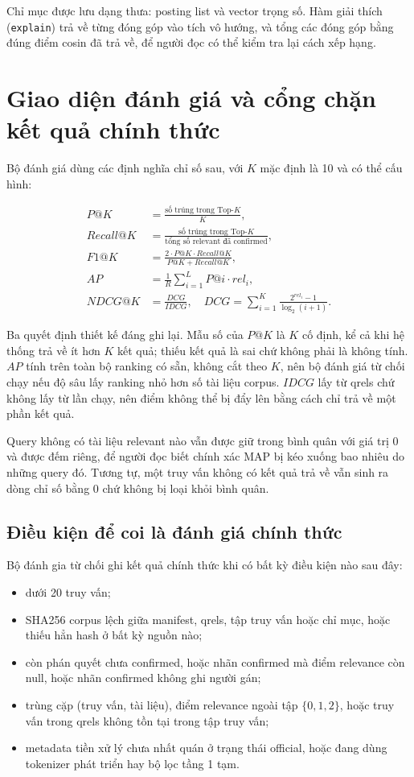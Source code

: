 Chỉ mục được lưu dạng thưa: posting list và vector trọng số. Hàm giải thích
(\texttt{explain}) trả về từng đóng góp vào tích vô hướng, và tổng các đóng góp
bằng đúng điểm cosin đã trả về, để người đọc có thể kiểm tra lại cách xếp hạng.

\section{Giao diện đánh giá và cổng chặn kết quả chính thức}

Bộ đánh giá dùng các định nghĩa chỉ số sau, với $K$ mặc định là 10 và có thể cấu
hình:

\begin{align}
P@K &= \frac{\text{số trúng trong Top-}K}{K}, \\
Recall@K &= \frac{\text{số trúng trong Top-}K}{\text{tổng số relevant đã confirmed}}, \\
F1@K &= \frac{2 \cdot P@K \cdot Recall@K}{P@K + Recall@K}, \\
AP &= \frac{1}{R}\sum_{i=1}^{L} P@i \cdot rel_i, \\
NDCG@K &= \frac{DCG}{IDCG},\quad DCG=\sum_{i=1}^{K}\frac{2^{rel_i}-1}{\log_2(i+1)} .
\end{align}

Ba quyết định thiết kế đáng ghi lại. Mẫu số của $P@K$ là $K$ cố định, kể cả khi
hệ thống trả về ít hơn $K$ kết quả; thiếu kết quả là sai chứ không phải là không
tính. $AP$ tính trên toàn bộ ranking có sẵn, không cắt theo $K$, nên bộ đánh giá
từ chối chạy nếu độ sâu lấy ranking nhỏ hơn số tài liệu corpus. $IDCG$ lấy từ
qrels chứ không lấy từ lần chạy, nên điểm không thể bị đẩy lên bằng cách chỉ
trả về một phần kết quả.

Query không có tài liệu relevant nào vẫn được giữ trong bình quân với giá trị 0 và
được đếm riêng, để người đọc biết chính xác MAP bị kéo xuống bao nhiêu do những
query đó. Tương tự, một truy vấn không có kết quả trả về vẫn sinh ra dòng chỉ số
bằng 0 chứ không bị loại khỏi bình quân.

\subsection{Điều kiện để coi là đánh giá chính thức}

Bộ đánh gia từ chối ghi kết quả chính thức khi có bất kỳ điều kiện nào sau đây:

\begin{itemize}
\item dưới 20 truy vấn;
\item SHA256 corpus lệch giữa manifest, qrels, tập truy vấn hoặc chỉ mục, hoặc
thiếu hẳn hash ở bất kỳ nguồn nào;
\item còn phán quyết chưa confirmed, hoặc nhãn confirmed mà điểm relevance còn
null, hoặc nhãn confirmed không ghi người gán;
\item trùng cặp (truy vấn, tài liệu), điểm relevance ngoài tập $\{0,1,2\}$, hoặc
truy vấn trong qrels không tồn tại trong tập truy vấn;
\item metadata tiền xử lý chưa nhất quán ở trạng thái official, hoặc đang dùng
tokenizer phát triển hay bộ lọc tầng 1 tạm.
\end{itemize}

